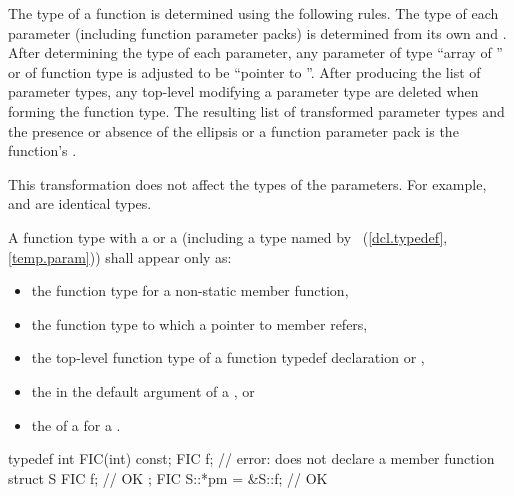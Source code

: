 \pnum
{}%
The type of a function is determined using the following rules.
The type of each parameter (including function parameter packs) is
determined from its own
and
.
After determining the type of each parameter, any parameter
%
of type ``array of '' or
%
of function type 
is adjusted to be ``pointer to ''.
After producing the list of parameter types,
any top-level
modifying a parameter type are deleted
when forming the function type.
The resulting list of transformed parameter types
and the presence or absence of the ellipsis or a function parameter pack
is the function's
.
\begin{note}
This transformation does not affect the types of the parameters.
For example,  and
 are identical types.
\end{note}

\pnum
A function type with a  or a
 (including a type named by
~(\ref{dcl.typedef}, \ref{temp.param}))
shall appear only as:
\begin{itemize}
\item the function type for a non-static member function,

\item the function type to which a pointer to member refers,

\item the top-level function type of a function typedef declaration
or ,

\item the  in the default argument of a
, or

\item the  of a  for a
.
\end{itemize}
\begin{example}
\begin{codeblock}
typedef int FIC(int) const;
FIC f;              // error: does not declare a member function
struct S {
  FIC f;            // OK
};
FIC S::*pm = &S::f; // OK
\end{codeblock}
\end{example}

